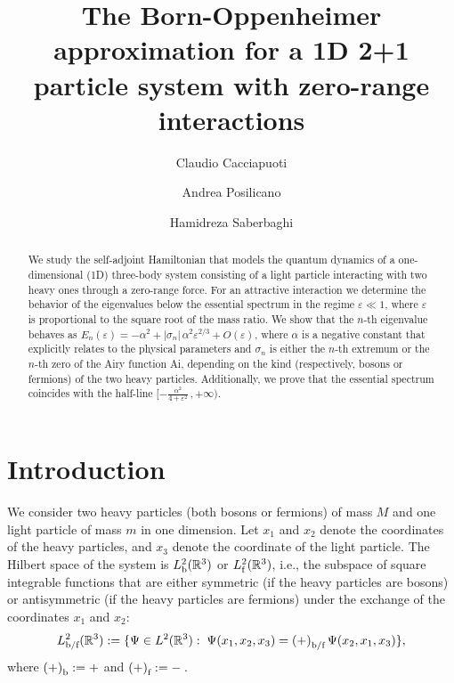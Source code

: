 \documentclass[a4paper,11pt,reqno]{amsart}
\title[]{The Born-Oppenheimer approximation for a 1D 2+1 particle system with zero-range  interactions}
\author{Claudio Cacciapuoti}
\author{Andrea Posilicano}
\author{Hamidreza Saberbaghi}
\theoremstyle{definition}
\numberwithin{equation}{section}
\newcommand{\RE}{\mathbb R}
\newcommand{\ve}{\varepsilon}
\newcommand{\bof}{\text{\rm b/f}}
\newcommand{\bos}{\text{\rm b}}
\newcommand{\fer}{\text{\rm f}}
\newcommand{\bosferpm}{{(+)}}
\begin{document}
\begin{abstract}
We study the self-adjoint Hamiltonian 
that models the quantum dynamics of a one-dimensional (1D) three-body system consisting of a light particle interacting with two heavy ones through a zero-range force.  For an attractive interaction we determine the behavior of   the eigenvalues below the essential spectrum in the regime $\varepsilon\ll 1$, where $\varepsilon$ is proportional to the square root of the mass ratio. We show that the $n$-th eigenvalue behaves as 
$E_{n}(\varepsilon)=-\alpha^{2}+|\sigma_{n}|\,\alpha^{2}\varepsilon^{2/3}+O(\varepsilon)$,   
where $\alpha$ is a negative constant that explicitly relates to the physical parameters and  $\sigma_{n}$ is either the $n$-th extremum or the $n$-th zero of the Airy function Ai, depending on the kind (respectively, bosons or fermions) of the two heavy particles. Additionally, we prove that the essential spectrum coincides with the half-line $[-\frac{\alpha^2}{4+\ve^{2}}\,,+\infty)$. 
\end{abstract}

\maketitle


\section{Introduction}

We consider two heavy particles (both bosons or fermions) of mass $M$ and one light particle of mass $m$  in one  dimension. Let $x_1$ and $x_2$ denote the coordinates of the heavy particles, and $x_3$ denote the coordinate of the light particle.   The Hilbert space of the system is $L^2_{\bos}(\RE^3)$ or $L^2_{\fer}(\RE^3)$, i.e., the subspace of square integrable functions that are either symmetric (if the heavy particles are bosons) or antisymmetric (if the heavy particles are  fermions) under the exchange of the coordinates $x_1$ and $x_2$:
\[
L^2_{\bof}(\RE^3) := \{\Psi\in L^2(\RE^3):\; \Psi(x_1,x_2,x_3) =\bosferpm_{\bof}\, \Psi(x_2,x_1,x_3) \},
\]
where $\bosferpm_{\bos} := +$ and $\bosferpm_{\fer} := -\,$. 
 
\end{document}
